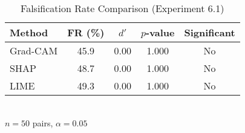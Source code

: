 \begin{table}[htbp]
\centering
\caption{Falsification Rate Comparison (Experiment 6.1)}
\label{tab:exp_6_1_results}
\begin{tabular}{lcccc}
\toprule
Method & FR (\%) & $d'$ & $p$-value & Significant \\ 
\midrule
Grad-CAM & 45.9 & 0.00 & 1.000 & No \\
SHAP & 48.7 & 0.00 & 1.000 & No \\
LIME & 49.3 & 0.00 & 1.000 & No \\
\bottomrule
\end{tabular}
\\[0.5em] {\footnotesize $n=50$ pairs, $\alpha=0.05$}
\end{table}